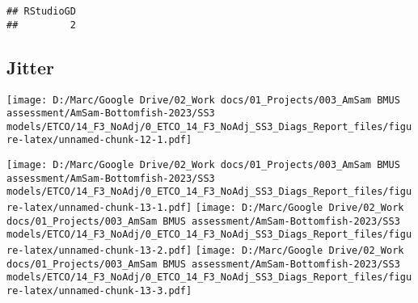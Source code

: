 \documentclass[
]{article}
\begin{document}
\begin{verbatim}
## RStudioGD 
##         2
\end{verbatim}

\hypertarget{jitter}{%
\subsection{Jitter}\label{jitter}}

\texttt{[image: D:/Marc/Google Drive/02\_Work docs/01\_Projects/003\_AmSam BMUS assessment/AmSam-Bottomfish-2023/SS3 models/ETCO/14\_F3\_NoAdj/0\_ETCO\_14\_F3\_NoAdj\_SS3\_Diags\_Report\_files/figure-latex/unnamed-chunk-12-1.pdf]}

\texttt{[image: D:/Marc/Google Drive/02\_Work docs/01\_Projects/003\_AmSam BMUS assessment/AmSam-Bottomfish-2023/SS3 models/ETCO/14\_F3\_NoAdj/0\_ETCO\_14\_F3\_NoAdj\_SS3\_Diags\_Report\_files/figure-latex/unnamed-chunk-13-1.pdf]}
\texttt{[image: D:/Marc/Google Drive/02\_Work docs/01\_Projects/003\_AmSam BMUS assessment/AmSam-Bottomfish-2023/SS3 models/ETCO/14\_F3\_NoAdj/0\_ETCO\_14\_F3\_NoAdj\_SS3\_Diags\_Report\_files/figure-latex/unnamed-chunk-13-2.pdf]}
\texttt{[image: D:/Marc/Google Drive/02\_Work docs/01\_Projects/003\_AmSam BMUS assessment/AmSam-Bottomfish-2023/SS3 models/ETCO/14\_F3\_NoAdj/0\_ETCO\_14\_F3\_NoAdj\_SS3\_Diags\_Report\_files/figure-latex/unnamed-chunk-13-3.pdf]}

\hypertarget{section}{%
\subsection{}\label{section}}
\end{document}

